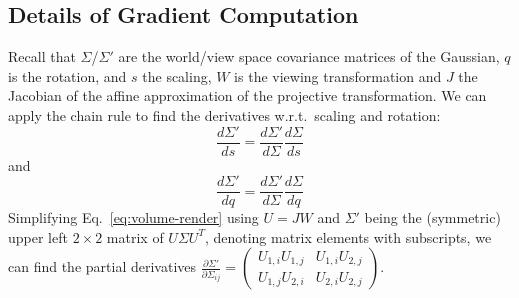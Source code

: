 
\begin{appendix}
	\section{Details of Gradient Computation}
	\label{sec:appa}
	Recall that $\Sigma$/$\Sigma'$ are the world/view space covariance matrices of the Gaussian, $q$ is the rotation, and $s$ the scaling, $W$ is the viewing transformation and $J$ the Jacobian of the affine approximation of the projective transformation.
	We can apply the chain rule to find the derivatives w.r.t.\ scaling and rotation:
	\begin{equation}
		\frac{d\Sigma'}{ds} = \frac{d\Sigma'}{d\Sigma}\frac{d\Sigma}{ds}
	\end{equation}
	and 
	\begin{equation}
		\frac{d\Sigma'}{dq} = \frac{d\Sigma'}{d\Sigma}\frac{d\Sigma}{dq}
	\end{equation}
	Simplifying Eq.~\ref{eq:volume-render} using $U = JW$ and $\Sigma'$ being the (symmetric) upper left $2\times2$ matrix of $U \Sigma U^T$, denoting matrix elements with subscripts, we can find the  partial derivatives
	$
		\frac{\partial \Sigma'}{\partial \Sigma_{ij}} = \left(\begin{smallmatrix}
			U_{1,i}U_{1,j} & U_{1,i} U_{2,j}\\
			U_{1,j} U_{2,i} & U_{2,i}U_{2,j}
		\end{smallmatrix}\right)
	$.
	

\end{appendix}
